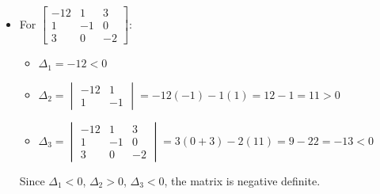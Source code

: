 \documentclass{article}
\begin{document}
\begin{itemize}
\item For $\begin{bmatrix} -12 & 1 & 3 \\ 1 & -1 & 0 \\ 3 & 0 & -2 \end{bmatrix}$:
\begin{itemize}
\item $\Delta_1 = -12 < 0$
\item $\Delta_2 = \begin{vmatrix} -12 & 1 \\ 1 & -1 \end{vmatrix} = -12(-1) - 1(1) = 12 - 1 = 11 > 0$
\item $\Delta_3 = \begin{vmatrix} -12 & 1 & 3 \\ 1 & -1 & 0 \\ 3 & 0 & -2 \end{vmatrix} = 3(0 + 3) - 2(11) = 9 - 22 = -13 < 0$
\end{itemize}
Since $\Delta_1 < 0$, $\Delta_2 > 0$, $\Delta_3 < 0$, the matrix is negative definite.
\end{itemize}
\end{document}
